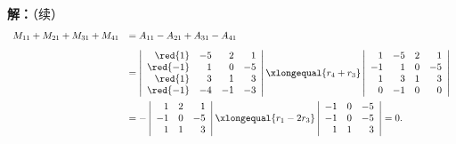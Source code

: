 \begin{frame}
  \begin{footnotesize}
    \textbf{解：}（续）\\[0.2cm]
    $$
    \begin{array}{ll}
      M_{11}+M_{21}+M_{31}+M_{41} &= A_{11}-A_{21}+A_{31}-A_{41} \\[0.3cm]
      & = 
      \left|
      \begin{array}{rrrr}
        \red{1}    & -5 & 2   &   1\\
        \red{-1}   &  1 & 0   &  -5\\
        \red{1}    &  3 & 1   &  3\\
        \red{-1}   & -4 & -1  & -3
      \end{array}
      \right| \xlongequal{r_4+r_3}
      \left|
      \begin{array}{rrrr}
        1    & -5 & 2   &   1\\
        -1   &  1 & 0   &  -5\\
        1    &  3 & 1   &  3\\
        0    & -1 & 0   &  0
      \end{array}
      \right| \\[0.8cm]
      & = -
      \left|
      \begin{array}{rrrr}
        1    &  2 &  1\\
        -1   &  0 &  -5\\
        1    &  1 &  3
      \end{array}
      \right|
      \xlongequal{r_1-2r_3}
      \left|
      \begin{array}{rrrr}
        -1   &  0 &  -5\\
        -1   &  0 &  -5\\
        1    &  1 &  3
      \end{array}
      \right| = 0.
    \end{array}
    $$

    
  \end{footnotesize}
\end{frame}
